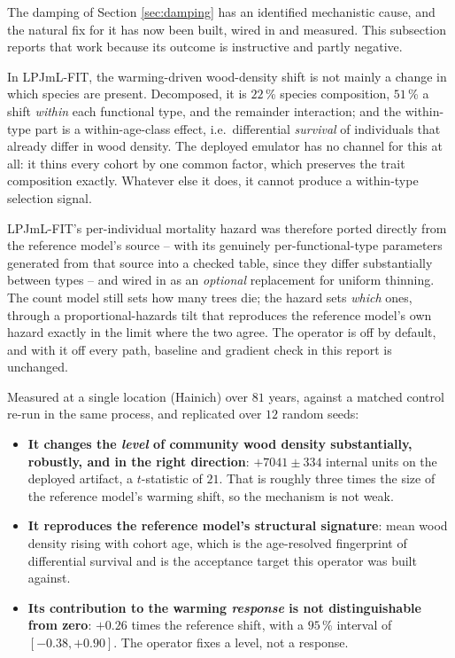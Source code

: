 \documentclass[11pt]{article}
\begin{document}
The damping of Section \ref{sec:damping} has an identified mechanistic cause, and the natural fix for it has now been built, wired in and measured. This subsection reports that work because its outcome is instructive and partly negative.

In LPJmL-FIT, the warming-driven wood-density shift is not mainly a change in which species are present. Decomposed, it is $22$\,\% species composition, $51$\,\% a shift \emph{within} each functional type, and the remainder interaction; and the within-type part is a within-age-class effect, i.e.\ differential \emph{survival} of individuals that already differ in wood density. The deployed emulator has no channel for this at all: it thins every cohort by one common factor, which preserves the trait composition exactly. Whatever else it does, it cannot produce a within-type selection signal.

LPJmL-FIT's per-individual mortality hazard was therefore ported directly from the reference model's source -- with its genuinely per-functional-type parameters generated from that source into a checked table, since they differ substantially between types -- and wired in as an \emph{optional} replacement for uniform thinning. The count model still sets how many trees die; the hazard sets \emph{which} ones, through a proportional-hazards tilt that reproduces the reference model's own hazard exactly in the limit where the two agree. The operator is off by default, and with it off every path, baseline and gradient check in this report is unchanged.

Measured at a single location (Hainich) over $81$ years, against a matched control re-run in the same process, and replicated over $12$ random seeds:

\begin{itemize}[leftmargin=1.4em]
\item \textbf{It changes the \emph{level} of community wood density substantially, robustly, and in the right direction}: $+7041 \pm 334$ internal units on the deployed artifact, a $t$-statistic of $21$. That is roughly three times the size of the reference model's warming shift, so the mechanism is not weak.
\item \textbf{It reproduces the reference model's structural signature}: mean wood density rising with cohort age, which is the age-resolved fingerprint of differential survival and is the acceptance target this operator was built against.
\item \textbf{Its contribution to the warming \emph{response} is not distinguishable from zero}: $+0.26$ times the reference shift, with a $95$\,\% interval of $[-0.38, +0.90]$. The operator fixes a level, not a response.
\end{itemize}
\end{document}
